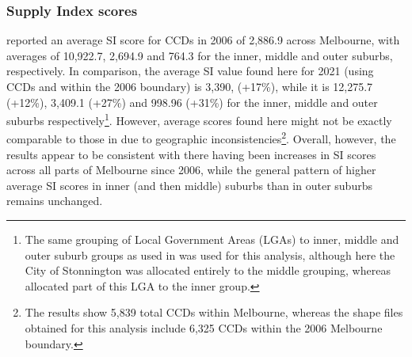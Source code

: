 \documentclass[preprint, 3p,
authoryear]{elsarticle} %
\begin{document}
\subsubsection{Supply Index scores}\label{supply-index-scores}

\citet{currie2010identifying} reported an average SI score for CCDs in
2006 of 2,886.9 across Melbourne, with averages of 10,922.7, 2,694.9 and
764.3 for the inner, middle and outer suburbs, respectively. In
comparison, the average SI value found here for 2021 (using CCDs and
within the 2006 boundary) is 3,390, (+17\%), while it is 12,275.7
(+12\%), 3,409.1 (+27\%) and 998.96 (+31\%) for the inner, middle and
outer suburbs respectively\footnote{The same grouping of Local
  Government Areas (LGAs) to inner, middle and outer suburb groups as
  used in \citet{currie2010identifying} was used for this analysis,
  although here the City of Stonnington was allocated entirely to the
  middle grouping, whereas \citet{currie2010identifying} allocated part
  of this LGA to the inner group.}. However, average scores found here
might not be exactly comparable to those in
\citet{currie2010identifying} due to geographic
inconsistencies\footnote{The \citet{currie2010identifying} results show
  5,839 total CCDs within Melbourne, whereas the shape files obtained
  for this analysis include 6,325 CCDs within the 2006 Melbourne
  boundary.}. Overall, however, the results appear to be consistent with
there having been increases in SI scores across all parts of Melbourne
since 2006, while the general pattern of higher average SI scores in
inner (and then middle) suburbs than in outer suburbs remains unchanged.
\end{document}
